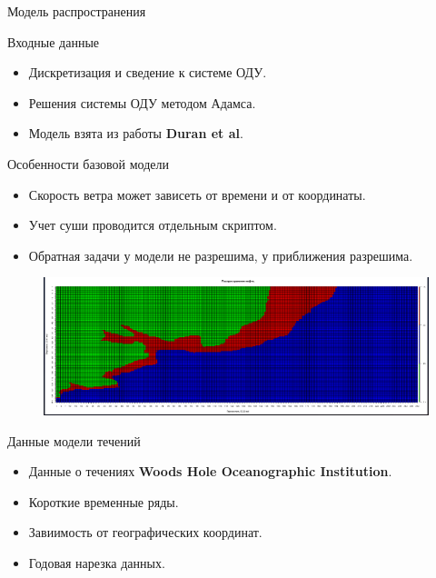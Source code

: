 \documentclass{beamer}
\begin{document}
\begin{section}{Модель распространения}
\begin{frame}{Входные данные}
\begin{itemize}
	\item Дискретизация и сведение к системе ОДУ.
	
	\item Решения системы ОДУ методом Адамса.
	
	\item Модель взята из работы \textbf{Duran et al}.
	
\end{itemize}
\end{frame}

\begin{frame}{Особенности базовой модели}
\begin{itemize}
	\item Скорость ветра может зависеть от времени и от координаты.
	\item Учет суши проводится отдельным скриптом.
	\item Обратная задачи у модели не разрешима, у приближения разрешима. 
\end{itemize}

\begin{figure}[H]
	\centering
	\includegraphics[scale=0.2]{photo_after.png}
\end{figure}
\end{frame}

\begin{frame}{Данные модели течений}
\begin{itemize}
	\item Данные о течениях \textbf{Woods Hole Oceanographic Institution}.
	\item Короткие временные ряды.
	\item Завиимость от географических координат.
	\item Годовая нарезка данных.
\end{itemize}


\end{frame}
\end{section}
\end{document}
